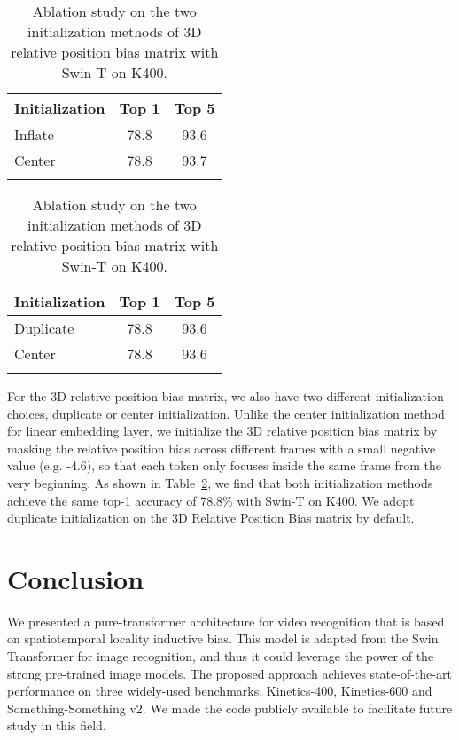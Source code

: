 \documentclass{article}
\begin{document}
\begin{table}[h]
\begin{minipage}{0.45\linewidth}
\centering
    \caption{Ablation study on the two initialization methods of linear embedding layer with Swin-T on K400.}
  \begin{tabular}{l|cc}
  \Xhline{1.0pt}
  Initialization & Top 1 & Top 5\\
  \hline
  Inflate & 78.8 & 93.6 \\
  Center & 78.8 & 93.7 \\
  \Xhline{1.0pt}
  \end{tabular}
  \label{table:init}
\end{minipage}\hfill
\begin{minipage}{0.45\linewidth}
\centering
    \caption{Ablation study on the two initialization methods of 3D relative position bias matrix with Swin-T on K400.}
  \begin{tabular}{l|cc}
  \Xhline{1.0pt}
  Initialization & Top 1 & Top 5\\
  \hline
  Duplicate & 78.8 & 93.6 \\
  Center & 78.8 & 93.6 \\
  \Xhline{1.0pt}
  \end{tabular}
  \label{table:init-pos}
\end{minipage}
\end{table}


For the 3D relative position bias matrix, we also have two different initialization choices, duplicate or center initialization. Unlike the center initialization method for linear embedding layer, we initialize the 3D relative position bias matrix by masking the relative position bias across different frames with a small negative value (e.g. -4.6), so that each token only focuses inside the same frame from the very beginning. As shown in Table~\ref{table:init-pos}, we find that both initialization methods achieve the same top-1 accuracy of 78.8\% with Swin-T on K400. We adopt duplicate initialization on the 3D Relative Position Bias matrix by default.


\section{Conclusion}
We presented a pure-transformer architecture for video recognition that is based on spatiotemporal locality inductive bias. This model is adapted from the Swin Transformer for image recognition, and thus it could leverage the power of the strong pre-trained image models. The proposed approach achieves state-of-the-art performance on three widely-used benchmarks, Kinetics-400, Kinetics-600 and Something-Something v2. We made the code publicly available to facilitate future study in this field.



\newpage



\end{document}
